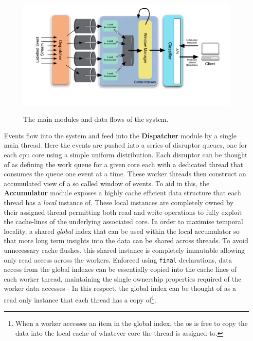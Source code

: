 \documentclass[a4paper,11pt]{scrreprt}
\begin{document}
\begin{figure}[h!]
\centering
\caption{The main modules and data flows of the system.}
\includegraphics[scale=0.72, trim=35 50 0 13, clip=true] {architectureoverview.pdf}
\label{fig:architectureoverview}
\end{figure}
Events flow into the system and feed into the \textbf{Dispatcher} module by a single main thread. Here the events are pushed into a series of disruptor queues, one for each \acrshort{cpu} core using a simple uniform distribution. Each disruptor can be thought of as defining the work queue for a given core each with a dedicated thread that consumes the queue one event at a time. These worker threads then construct an accumulated view of a so called window of events. To aid in this, the \textbf{Accumulator} module exposes a highly cache efficient data structure that each thread has a \textit{local} instance of. These local instances are completely owned by their assigned thread permitting both read and write operations to fully exploit the cache-lines of the underlying associated core. In order to maximise temporal locality, a shared \textit{global} index that can be used within the local accumulator so that more long term insights into the data can be shared across threads. To avoid unnecessary cache flushes, this shared instance is completely immutable allowing only read access across the workers. Enforced using \texttt{final} declarations, data access from the global indexes can be essentially copied into the cache lines of each worker thread, maintaining the single ownership properties required of the worker data accesses - In this respect, the global index can be thought of as a read only instance that each thread has a copy of\footnote{When a worker accesses an item in the global index, the \acrshort{os} is free to copy the data into the local cache of whatever core the thread is assigned to.}.
\end{document}
